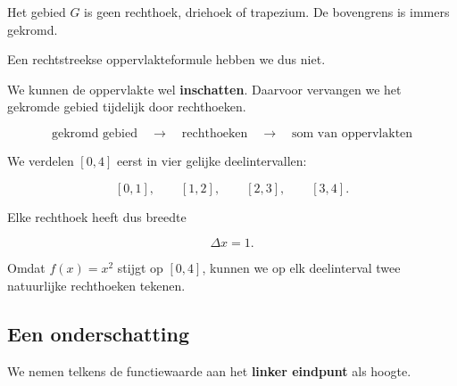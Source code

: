 \documentclass{ximera}
\begin{document}
Het gebied \(G\) is geen rechthoek, driehoek of trapezium. De bovengrens
is immers gekromd.

Een rechtstreekse oppervlakteformule hebben we dus niet.

We kunnen de oppervlakte wel \textbf{inschatten}. Daarvoor vervangen we
het gekromde gebied tijdelijk door rechthoeken.

\[
\boxed{
\text{gekromd gebied}
\quad\longrightarrow\quad
\text{rechthoeken}
\quad\longrightarrow\quad
\text{som van oppervlakten}
}
\]




We verdelen \([0,4]\) eerst in vier gelijke deelintervallen:

\[
[0,1],\qquad [1,2],\qquad [2,3],\qquad [3,4].
\]

Elke rechthoek heeft dus breedte

\[
\Delta x=1.
\]

Omdat \(f(x)=x^2\) stijgt op \([0,4]\), kunnen we op elk deelinterval
twee natuurlijke rechthoeken tekenen.

\subsection*{Een onderschatting}

We nemen telkens de functiewaarde aan het \textbf{linker eindpunt} als
hoogte.

\begin{center}
\end{center}
\end{document}
